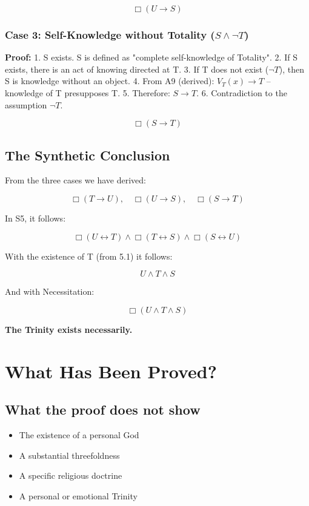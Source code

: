 \documentclass[
]{article}
\begin{document}
\[
\boxed{\Box(U \rightarrow S)}
\]

\subsubsection{Case 3: Self-Knowledge without Totality (\(S \land \neg T\))}\label{case-3-self-knowledge-without-totality-s-land-neg-t}

\textbf{Proof:}
1. S exists. S is defined as "complete self-knowledge of Totality".
2. If S exists, there is an act of knowing directed at T.
3. If T does not exist (\(\neg T\)), then S is knowledge without an object.
4. From A9 (derived): \(V_T(x) \rightarrow T\) – knowledge of T presupposes T.
5. Therefore: \(S \rightarrow T\).
6. Contradiction to the assumption \(\neg T\).

\[
\boxed{\Box(S \rightarrow T)}
\]

\subsection{The Synthetic Conclusion}\label{the-synthetic-conclusion}

From the three cases we have derived:

\[
\Box(T \rightarrow U), \quad \Box(U \rightarrow S), \quad \Box(S \rightarrow T)
\]

In S5, it follows:

\[
\Box(U \leftrightarrow T) \land \Box(T \leftrightarrow S) \land \Box(S \leftrightarrow U)
\]

With the existence of T (from 5.1) it follows:

\[
\boxed{U \land T \land S}
\]

And with Necessitation:

\[
\boxed{\Box(U \land T \land S)}
\]

\textbf{The Trinity exists necessarily.}

\section{What Has Been Proved?}\label{what-has-been-proved}

\subsection{What the proof does not show}\label{what-the-proof-does-not-show}

\begin{itemize}
\item The existence of a personal God
\item A substantial threefoldness
\item A specific religious doctrine
\item A personal or emotional Trinity
\end{itemize}
\end{document}
